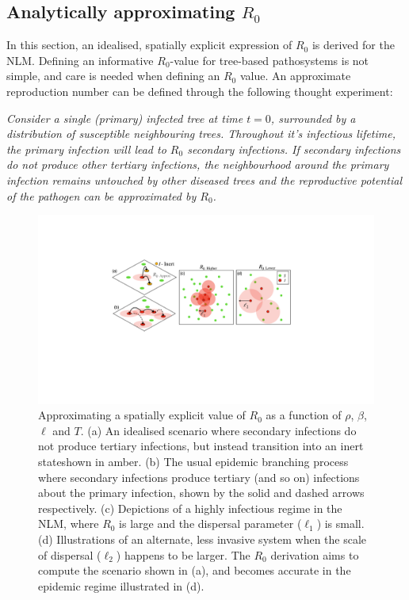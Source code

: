 \subsection{Analytically approximating $R_0$}


In this section, an idealised, spatially explicit expression of $R_0$ is derived for the NLM.
Defining an informative $R_0$-value for tree-based pathosystems is not simple, and care is needed when defining an $R_0$ value. 
An approximate reproduction number can be defined through the following thought experiment: 

\textit{Consider a single (primary) infected tree at time $t=0$, surrounded by a distribution of susceptible neighbouring trees. Throughout it's infectious lifetime, the primary infection will lead to $R_0$ secondary infections. If secondary infections do not produce other tertiary infections, the neighbourhood around the primary infection remains untouched by other diseased trees and the reproductive potential of the pathogen can be approximated by $R_0$. }

\begin{figure}
    \centering
    \includegraphics[scale=0.45]{chapter5/figures/fig3a-R0-approx.pdf}
    \caption{
    Approximating a spatially explicit value of $R_0$ as a function of $\rho$, $\beta$, $\ell$ and $T$.
    (a) An idealised scenario where secondary infections do not produce tertiary infections, but instead transition into an inert state\textemdash shown in amber.
    (b) The usual epidemic branching process where secondary infections produce tertiary (and so on) infections about the primary infection, shown by the solid and dashed arrows respectively.
    (c) Depictions of a highly infectious regime in the NLM, where $R_0$ is large and the dispersal parameter ($\ell_1$) is small.
    (d) Illustrations of an alternate, less invasive system when the scale of dispersal ($\ell_2$) happens to be larger. 
    The $R_0$ derivation aims to compute the scenario shown in (a), and becomes accurate in the epidemic regime illustrated in (d).
    }
    \label{fig:R0-approx}
\end{figure}

